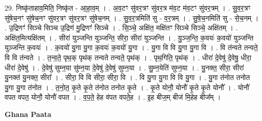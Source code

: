 \documentclass[17pt]{extarticle}
\begin{document}
29. निष्कृ॑ताहाव॒मिति॒ निष्कृ॑त - आ॒हा॒व॒म् । . अ॒व॒टꣳ सु॑वर॒त्रꣳ सु॑वर॒त्र म॑व॒ट म॑व॒टꣳ सु॑वर॒त्रम् । . सु॒व॒र॒त्रꣳ सु॑षेच॒नꣳ सु॑षेच॒नꣳ सु॑वर॒त्रꣳ सु॑वर॒त्रꣳ सु॑षेच॒नम् । . सु॒व॒र॒त्रमिति॑ सु - व॒र॒त्रम् । . सु॒षे॒च॒नमिति॑ सु - से॒च॒नम् । . उ॒द्रिणꣳ॑ सिञ्चे सिञ्च उ॒द्रिण॑ मु॒द्रिणꣳ॑ सिञ्चे । . सि॒ञ्चे॒ अक्षि॑त॒ मक्षि॑तꣳ सिञ्चे सिञ्चे॒ अक्षि॑तम् । . अक्षि॑त॒मित्यक्षि॑तम् । . सीरा॑ युञ्जन्ति युञ्जन्ति॒ सीरा॒ सीरा॑ युञ्जन्ति । . यु॒ञ्ज॒न्ति॒ क॒वयः॑ क॒वयो॑ युञ्जन्ति युञ्जन्ति क॒वयः॑ । . क॒वयो॑ यु॒गा यु॒गा क॒वयः॑ क॒वयो॑ यु॒गा । . यु॒गा वि वि यु॒गा यु॒गा वि । . वि त॑न्वते तन्वते॒ वि वि त॑न्वते । . त॒न्व॒ते॒ पृथ॒क् पृथ॑क् तन्वते तन्वते॒ पृथ॑क् । . पृथ॒गिति॒ पृथ॑क् । . धीरा॑ दे॒वेषु॑ दे॒वेषु॒ धीरा॒ धीरा॑ दे॒वेषु॑ । . दे॒वेषु॑ सुम्न॒या सु॑म्न॒या दे॒वेषु॑ दे॒वेषु॑ सुम्न॒या । . सु॒म्न॒येति॑ सुम्न॒या । . यु॒नक्त॒ सीरा॒ सीरा॑ यु॒नक्त॑ यु॒नक्त॒ सीरा᳚ । . सीरा॒ वि वि सीरा॒ सीरा॒ वि । . वि यु॒गा यु॒गा वि वि यु॒गा । . यु॒गा त॑नोत तनोत यु॒गा यु॒गा त॑नोत । . त॒नो॒त॒ कृ॒ते कृ॒ते त॑नोत तनोत कृ॒ते । . कृ॒ते योनौ॒ योनौ॑ कृ॒ते कृ॒ते योनौ᳚ । . योनौ॑ वपत वपत॒ योनौ॒ योनौ॑ वपत । . व॒प॒ते॒ हेह व॑पत वपते॒ह । . इ॒ह बीज॒म् बीज॑ मि॒हेह बीज᳚म् । \newline

\textbf{Ghana Paata } \newline
\end{document}
